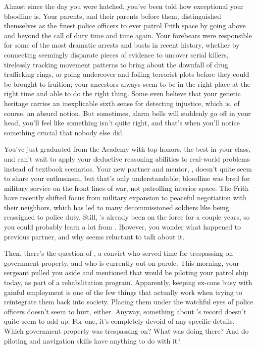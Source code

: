 \documentclass[char]{guildcamp4}
\begin{document}
\name{\cCgood{}}

Almost since the day you were hatched, you've been told how exceptional your bloodline is. Your parents, and their parents before them, distinguished themselves as the finest police officers to ever patrol Frith space by going above and beyond the call of duty time and time again. Your forebears were responsible for some of the most dramatic arrests and busts in recent history, whether by connecting seemingly disparate pieces of evidence to uncover serial killers, tirelessly tracking movement patterns to bring about the downfall of drug trafficking rings, or going undercover and foiling terrorist plots before they could be brought to fruition; your ancestors always seem to be in the right place at the right time and able to do the right thing. Some even believe that your genetic heritage carries an inexplicable sixth sense for detecting injustice, which is, of course, an absurd notion. But sometimes, alarm bells will suddenly go off in your head, you'll feel like something isn't quite right, and that's when you'll notice something crucial that nobody else did. 

You've just graduated from the Academy with top honors, the best in your class, and can't wait to apply your deductive reasoning abilities to real-world problems instead of textbook scenarios. Your new partner and mentor, \cCbad{}, doesn't quite seem to share your enthusiasm, but that's only understandable; \cCbad{\their} bloodline was bred for military service on the front lines of war, not patrolling interior space. The Frith have recently shifted focus from military expansion to peaceful negotiation with their neighbors, which has led to many decommissioned soldiers like \cCbad{} being reassigned to police duty. Still, \cCbad{\they}'s already been on the force for a couple years, so you could probably learn a lot from \cCbad{\them}. However, you wonder what happened to \cCbad{\their} previous partner, and why \cCbad{\they} seems reluctant to talk about it.

Then, there's the question of \cPilot{}, a convict who served time for trespassing on government property, and who is currently out on parole. This morning, your sergeant pulled you aside and mentioned that \cPilot{} would be piloting your patrol ship today, as part of a rehabilitation program. Apparently, keeping ex-cons busy with gainful employment is one of the few things that actually work when trying to reintegrate them back into society. Placing them under the watchful eyes of police officers doesn't seem to hurt, either. Anyway, something about \cPilot{}'s record doesn't quite seem to add up. For one, it's completely devoid of any specific details. Which government property was \cPilot{\they} trespassing on? What was \cPilot{\they} doing there? And do \cPilot{\their} piloting and navigation skills have anything to do with it?
\end{document}
